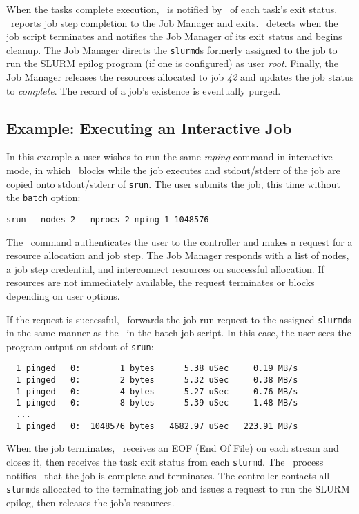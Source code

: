 \documentclass[10pt,onecolumn,times]{llncs}
\begin{document}
{When the tasks complete execution, \srun\ is notified by \slurmd\ of
each task's exit status. \srun\ reports job step completion to the Job
Manager and exits.  \slurmd\ detects when the job script terminates and
notifies the Job Manager of its exit status and begins cleanup.  The Job
Manager directs the {\tt slurmd}s formerly assigned to the job to run
the SLURM epilog program (if one is configured) as user {\em root}.
Finally, the Job Manager releases the resources allocated to job {\em 42}
and updates the job status to {\em complete}. The record of a job's
existence is eventually purged.

\subsection{Example:  Executing an Interactive Job}

In this example a user wishes to run the same {\em mping} command
in interactive mode, in which \srun\ blocks while the job executes
and stdout/stderr of the job are copied onto stdout/stderr of {\tt srun}.
The user submits the job, this time without the {\tt batch} option:

\begin{verbatim}
srun --nodes 2 --nprocs 2 mping 1 1048576
\end{verbatim}

The \srun\ command authenticates the user to the controller and makes a
request for a resource allocation and job step. The Job Manager
responds with a list of nodes, a job step credential, and interconnect
resources on successful allocation. If resources are not immediately
available, the request terminates or blocks depending on user options.

If the request is successful, \srun\ forwards the job run request to
the assigned {\tt slurmd}s in the same manner as the \srun\ in the batch
job script. In this case, the user sees the program output on stdout of
{\tt srun}:

\begin{verbatim}
  1 pinged   0:        1 bytes      5.38 uSec     0.19 MB/s
  1 pinged   0:        2 bytes      5.32 uSec     0.38 MB/s
  1 pinged   0:        4 bytes      5.27 uSec     0.76 MB/s
  1 pinged   0:        8 bytes      5.39 uSec     1.48 MB/s
  ...
  1 pinged   0:  1048576 bytes   4682.97 uSec   223.91 MB/s
\end{verbatim}

When the job terminates, \srun\ receives an EOF (End Of File) on each
stream and closes it, then receives the task exit status from each
{\tt slurmd}.  The \srun\ process notifies \slurmctld\ that the job is
complete and terminates. The controller contacts all {\tt slurmd}s allocated
to the terminating job and issues a request to run the SLURM epilog,
then releases the job's resources.

}
\end{document}
